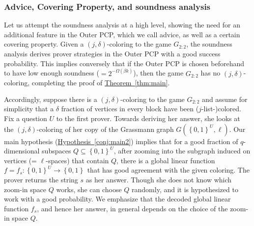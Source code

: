\documentclass[11pt]{article}
\numberwithin{equation}{section}
\theoremstyle{definition}
\theoremstyle{plain}
\newcommand{\expref}[2]{\hyperref[#2]{#1~\ref{#2}}}
\newcommand\set[1]{{\left\{ #1 \right\}}}
\newcommand\power[1]{\set{0,1}^{#1}}
\begin{document}
%
\subsubsection{Advice, Covering Property, and soundness analysis}

Let us attempt the soundness analysis at a
high level, showing the need for an additional
%
feature in the Outer PCP, which we call advice, as well as a certain
covering property.
%
Given a $(j,\delta)$-coloring to
the game $G_{2:2}$, the soundness analysis derives prover strategies in the Outer PCP with a good success probability.
This implies conversely that if the Outer PCP is chosen beforehand to have low enough soundness ($= 2^{-\Omega(\beta k)}$), then
the game $G_{2:2}$ has no $(j,\delta)$-coloring, completing the proof of \expref{Theorem}{thm:main}.

Accordingly, suppose there is a $(j,\delta)$-coloring to the game $G_{2:2}$ and assume for simplicity
that a $\delta$ fraction of vertices in every block have been ($j$-list-)colored. Fix a question $U$ to the first prover. Towards
deriving her answer, she looks at the $(j,\delta)$-coloring of her copy of the Grassmann graph $G(\power{U},\ell)$.
Our main hypothesis
(\expref{Hypothesis}{conj:main2}) implies that for a good fraction of $q$-dimensional subspaces $Q \subseteq \power{U}$, after zooming into the
subgraph induced on vertices (= $\ell$-spaces) that contain $Q$, there is a global linear function $f = f_s:\power{U} \to \power{}$
that has good agreement with the given coloring. The prover returns the string $s$ as her answer. Though
she does not know which zoom-in space $Q$ works, she can choose $Q$ randomly, and it is hypothesized  to work with a good
probability. We emphasize that the decoded
%
global linear function $f_s$, and hence her answer, in general depends on the choice of the zoom-in space $Q$.
\end{document}
